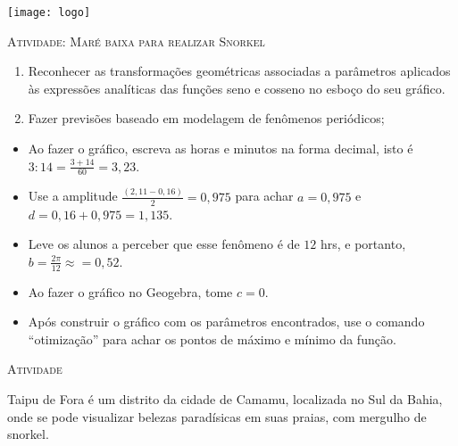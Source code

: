\documentclass[10 pt,usenames,dvipsnames, oneside]{article}
\begin{document}
\begin{center}
  \begin{minipage}[l]{3cm}
\texttt{[image: logo]}    
\end{minipage}\hfill
\begin{minipage}[r]{.8\textwidth}
 {\Large \scshape Atividade: Maré baixa para realizar Snorkel}  
\end{minipage}
\end{center}
\vspace{.2cm}

\ifdefined\prof

\begin{goals}
\begin{enumerate}
\item  Reconhecer as transformações geométricas associadas a
parâmetros aplicados às expressões analíticas das funções
seno e cosseno no esboço do seu gráfico.
\item Fazer previsões baseado em modelagem de fenômenos
periódicos;
\end{enumerate}

\tcblower

\begin{itemize}
\item Ao fazer o gráfico, escreva as horas e minutos na forma decimal, isto é $3:14=\frac{3+14}{60}=3{,}23$.
\item Use a amplitude $\frac{(2{,}11-0{,}16)}{2}=0{,}975$ para achar $a=0{,}975$ e $d=0{,}16+0{,}975=1{,}135$.
\item Leve os alunos a perceber que esse fenômeno é de $12$ hrs, e
portanto, $b=\frac{2\pi}{12}\approx=0{,}52$.
\item Ao fazer o gráfico no Geogebra, tome $c=0$.
\item Após construir o gráfico com os parâmetros encontrados, use o comando “otimização”{} para achar os pontos de máximo e mínimo da função.
\end{itemize}
\end{goals}

\bigskip
\begin{center}
{\large \scshape Atividade}
\end{center}
\fi

Taipu de Fora é um distrito da cidade de Camamu, localizada no Sul da Bahia, onde se pode visualizar belezas paradísicas em suas praias, com mergulho de snorkel.
\end{document}
